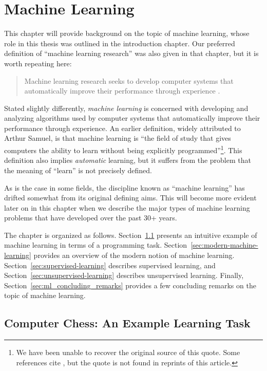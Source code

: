 \chapter{Machine Learning}
\label{ch:machine_learning}
%
This chapter will provide background on the topic of machine learning, whose role in this thesis was outlined in the introduction chapter. Our preferred definition of ``machine learning research'' was also given in that chapter, but it is worth repeating here:
%
\begin{quote}
Machine learning research seeks to develop computer systems that automatically improve their performance through experience \cite{Mitchell1990}.
\end{quote}
%	
Stated slightly differently, \emph{machine learning} is concerned with developing and analyzing algorithms used by computer systems that automatically improve their performance through experience. An earlier definition, widely attributed to Arthur Samuel, is that machine learning is ``the field of study that gives computers the ability to learn without being
explicitly programmed''\footnote{We have been unable to recover the original source of this quote. Some references cite \cite{samuel1959some}, but the quote is not found in reprints of this article.}. This definition also implies \emph{automatic} learning, but it suffers from the problem that the meaning of ``learn'' is not precisely defined.

As is the case in some fields, the discipline known as ``machine learning'' has drifted somewhat from its original defining aims. This will become more evident later on in this chapter when we describe the major types of machine learning problems that have developed over the past 30+ years.

The chapter is organized as follows. Section~\ref{sec:chess} presents an intuitive example of machine learning in terms of a programming task. Section~\ref{sec:modern-machine-learning} provides an overview of the modern notion of machine learning. Section~\ref{sec:supervised-learning} describes supervised learning, and Section~\ref{sec:unsupervised-learning} describes unsupervised learning. Finally, Section~\ref{sec:ml_concluding_remarks} provides a few concluding remarks on the topic of machine learning.


\section{Computer Chess: An Example Learning Task}
\label{sec:chess}

